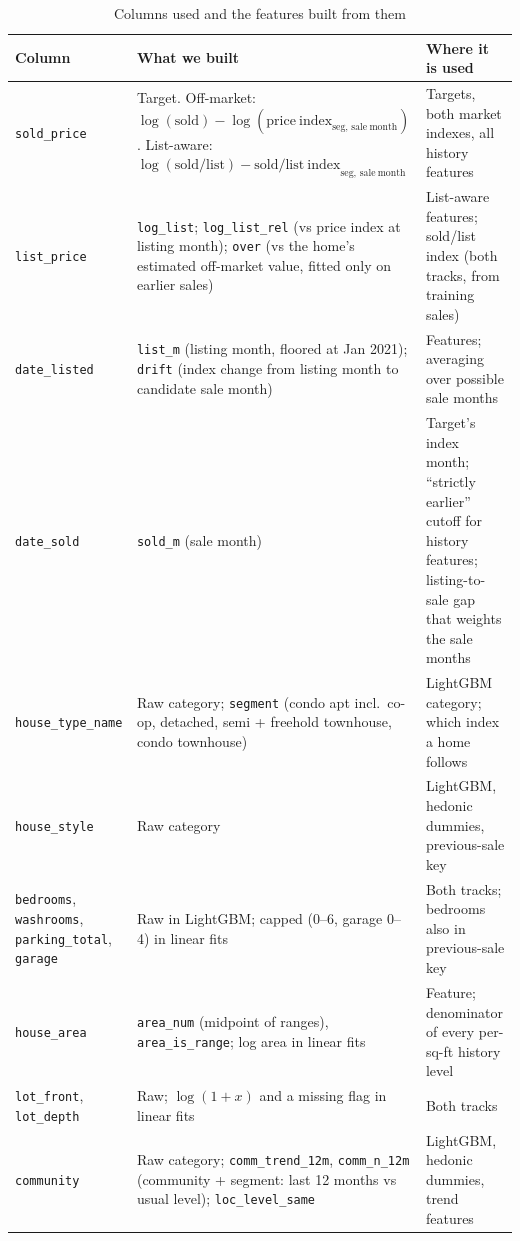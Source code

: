 
\begin{table}[ht]
\centering
\small
\caption{Columns used and the features built from them}
\label{tab:columns-used}
\begin{tabularx}{\textwidth}{p{2.7cm}Xp{3.3cm}}
\hline
Column & What we built & Where it is used \\
\hline
\texttt{sold\_price} & Target. Off-market: $\log(\mathrm{sold}) - \log(\mathrm{price\ index}_{\mathrm{seg,\,sale\ month}})$. List-aware: $\log(\mathrm{sold}/\mathrm{list}) - \mathrm{sold/list\ index}_{\mathrm{seg,\,sale\ month}}$ & Targets, both market indexes, all history features \\
\texttt{list\_price} & \texttt{log\_list}; \texttt{log\_list\_rel} (vs price index at listing month); \texttt{over} (vs the home's estimated off-market value, fitted only on earlier sales) & List-aware features; sold/list index (both tracks, from training sales) \\
\texttt{date\_listed} & \texttt{list\_m} (listing month, floored at Jan 2021); \texttt{drift} (index change from listing month to candidate sale month) & Features; averaging over possible sale months \\
\texttt{date\_sold} & \texttt{sold\_m} (sale month) & Target's index month; ``strictly earlier'' cutoff for history features; listing-to-sale gap that weights the sale months \\
\texttt{house\_type\_name} & Raw category; \texttt{segment} (condo apt incl.\ co-op, detached, semi + freehold townhouse, condo townhouse) & LightGBM category; which index a home follows \\
\texttt{house\_style} & Raw category & LightGBM, hedonic dummies, previous-sale key \\
\texttt{bedrooms}, \texttt{washrooms}, \texttt{parking\_total}, \texttt{garage} & Raw in LightGBM; capped (0--6, garage 0--4) in linear fits & Both tracks; bedrooms also in previous-sale key \\
\texttt{house\_area} & \texttt{area\_num} (midpoint of ranges), \texttt{area\_is\_range}; log area in linear fits & Feature; denominator of every per-sq-ft history level \\
\texttt{lot\_front}, \texttt{lot\_depth} & Raw; $\log(1+x)$ and a missing flag in linear fits & Both tracks \\
\texttt{community} & Raw category; \texttt{comm\_trend\_12m}, \texttt{comm\_n\_12m} (community + segment: last 12 months vs usual level); \texttt{loc\_level\_same} & LightGBM, hedonic dummies, trend features \\

\end{tabularx}
\end{table}
